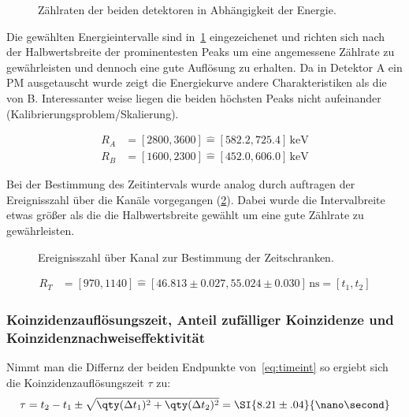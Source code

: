 \documentclass[slug=PET, room=Andreas-Schubert-Bau\,\ 424A, supervisor=Carsten\ Bittrich, coursedate=10.\ 01.\ 2020]{../../Lab_Report_LaTeX/lab_report}
\begin{document}
\begin{figure}[h]\centering
  
  \caption{Z\"ahlraten der beiden detektoren in Abhängigkeit der Energie.}
  \label{fig:calibration-mid_over_energy}
\end{figure}

Die gew\"ahlten Energieintervalle sind
in~\ref{fig:calibration-mid_over_energy} eingezeichenet und richten
sich nach der Halbwertsbreite der prominentesten Peaks um eine
angemessene Z\"ahlrate zu gew\"ahrleisten und dennoch eine gute
Auflösung zu erhalten. Da in Detektor A ein PM ausgetauscht wurde
zeigt die Energiekurve andere Charakteristiken als die von
B. Interessanter weise liegen die beiden h\"ochsten Peaks nicht
aufeinander (Kalibrierungsproblem/Skalierung).

\begin{align}
  R_A &= [2800, 3600] \hat{=} [582.2, 725.4]\,\si{\kilo\electronvolt}
  \\
  R_B &= [1600, 2300] \hat{=} [452.0, 606.0]\,\si{\kilo\electronvolt}
\end{align}

Bei der Bestimmung des Zeitintervals wurde analog durch auftragen der
Ereignisszahl \"uber die Kan\"ale vorgegangen
(\ref{fig:calibration-time_range}). Dabei wurde die Intervalbreite
etwas gr\"o\ss{}er als die die Halbwertsbreite gew\"ahlt um eine gute
Z\"ahlrate zu gew\"ahrleisten.

\begin{figure}[h]\centering
  
  \caption{Ereignisszahl \"uber Kanal zur Bestimmung der Zeitschranken.}
  \label{fig:calibration-time_range}
\end{figure}

\begin{align}
  \label{eq:timeint}
  R_T &= [970, 1140] \hat{=} [46.813\pm 0.027, 55.024\pm
        0.030]\,\si{\nano\second} = [t_1, t_2]
\end{align}

\subsubsection{Koinzidenzaufl\"osungszeit, Anteil zuf\"alliger
  Koinzidenze und Koinzidenznachweiseffektivit\"at}
\label{sec:koaufl}

Nimmt man die Differnz der beiden Endpunkte von~\eqref{eq:timeint} so
ergiebt sich die Koinzidenzaufl\"osungszeit \(\tau\) zu:
\begin{equation}
  \label{eq:koauf}
  \tau = t_2 - t_1 \pm \sqrt{\qty(\Delta t_1)^2 + \qty(\Delta t_2)^2}
  = \SI{8.21\pm .04}{\nano\second}
\end{equation}
\end{document}
